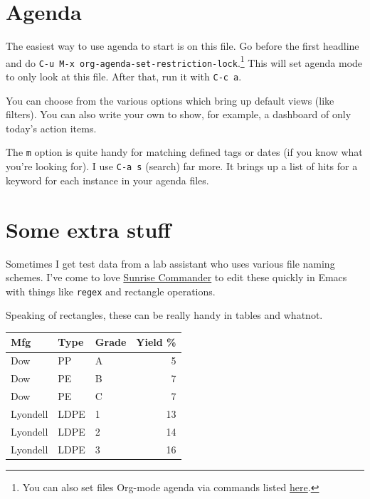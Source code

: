 \documentclass[11pt]{article}
\begin{document}
\section*{Agenda}
\label{sec:orgheadline18}

The easiest way to use agenda to start is on this file. Go before the first headline and
do \texttt{C-u M-x org-agenda-set-restriction-lock}.\footnote{You can also set files Org-mode agenda via commands listed \href{http://orgmode.org/manual/Agenda-files.html#Agenda-files}{here}.} This will set agenda mode to only look at
this file. After that, run it with \texttt{C-c a}.

You can choose from the various options which bring up default views (like filters). You
can also write your own to show, for example, a dashboard of only today's action items.

The \texttt{m} option is quite handy for matching defined tags or dates (if you know what you're
looking for). I use \texttt{C-a s} (search) far more. It brings up a list of hits for a keyword
for each instance in your agenda files.

\section*{Some extra stuff}
\label{sec:orgheadline20}

Sometimes I get test data from a lab assistant who uses various file naming schemes. I've
come to love \href{http://www.emacswiki.org/emacs/Sunrise_Commander}{Sunrise Commander} to edit these quickly in Emacs with things like \texttt{regex} and
rectangle operations.

Speaking of rectangles, these can be really handy in tables and whatnot.

\begin{center}
\begin{tabular}{lllr}
\toprule
\textbf{Mfg} & \textbf{Type} & \textbf{Grade} & \textbf{Yield \%}\\
\midrule
Dow & PP & A & 5\\
Dow & PE & B & 7\\
Dow & PE & C & 7\\
Lyondell & LDPE & 1 & 13\\
Lyondell & LDPE & 2 & 14\\
Lyondell & LDPE & 3 & 16\\
\bottomrule
\end{tabular}
\end{center}
\end{document}
